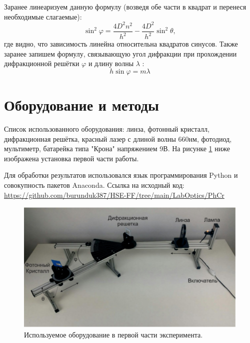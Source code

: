 \documentclass[a4paper, 12pt]{article}
\renewcommand{\phi}{\varphi} %
\begin{document}
	Заранее линеаризуем данную формулу (возведя обе части в квадрат и перенеся необходимые слагаемые):
	\begin{equation}\label{linear}
	\sin^{2}{\phi}=\frac{4D^{2}n^{2}}{h^2}-\frac{4D^{2}}{h^{2}}\sin^{2}{\theta},
	\end{equation}
	где видно, что зависимость линейна относительна квадратов синусов.
	Также заранее запишем формулу, связывающую угол дифракции при
	прохождении дифракционной решётки $\phi$ и длину волны $\lambda$ :
	\begin{equation}\label{diflen}
	h\sin{\phi} = m\lambda
	\end{equation}
	\section*{Оборудование и методы}
	Список использованного оборудования: линза, фотонный кристалл, дифракционная решётка, красный лазер с длиной волны 660нм, фотодиод, мультиметр, батарейка типа "Крона" напряжением 9В. На рисунке \ref{fig:2} ниже изображена установка первой части работы.
	
	Для обработки результатов использовался язык программирования Python и совокупность пакетов Anaconda.
	\newline
	Ссылка на исходный код: \href{https://github.com/burunduk387/HSE-FF/tree/main/LabOptics/PhCr}{https://github.com/burunduk387/HSE-FF/tree/main/LabOptics/PhCr}
	\begin{figure}[H]
		\centering
		\includegraphics[width=1\linewidth]{Equip.png}
		\caption{Используемое оборудование в первой части эксперимента.}
		\label{fig:2}
	\end{figure}
\end{document}
